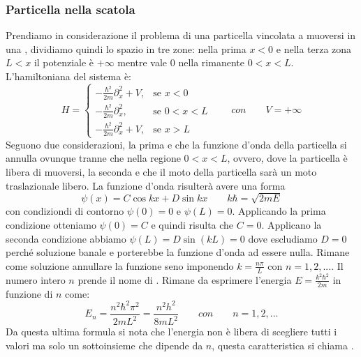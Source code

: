\subsubsection{Particella nella scatola}
Prendiamo in considerazione il problema di una particella vincolata a muoversi in una , dividiamo quindi lo spazio in tre zone: nella prima $x < 0$ e nella terza zona $L < x$ il potenziale è $+\infty$ mentre vale $0$ nella rimanente $0 < x < L$. L'hamiltoniana del sistema è:
$$H=\begin{cases}
 - \frac{\hbar^2}{2m} \partial_x^2 + V, & \mbox{se } x<0   \\
 - \frac{\hbar^2}{2m} \partial_x^2,     & \mbox{se } 0<x<L \\
 - \frac{\hbar^2}{2m} \partial_x^2 + V, & \mbox{se } x>L
\end{cases} \qquad con \qquad V = +\infty$$
Seguono due considerazioni, la prima e che la funzione d'onda della particella si annulla ovunque tranne che nella regione $0 < x < L$, ovvero, dove la particella è libera di muoversi, la seconda e che il moto della particella sarà un moto traslazionale libero. La funzione d'onda risulterà avere una forma
$$\psi(x) = C \cos{kx} + D \sin{kx} \qquad k\hbar = \sqrt{2mE}$$
con condiziondi di contorno $\psi(0) = 0$ e $\psi(L) = 0$. Applicando la prima condizione otteniamo $\psi(0) = C$ e quindi risulta che $C = 0$. Applicano la seconda condizione abbiamo $\psi(L) = D \sin(kL) = 0$ dove escludiamo $D = 0$ perché soluzione banale e porterebbe la funzione d'onda ad essere nulla. Rimane come soluzione annullare la funzione seno imponendo $k = \frac{n\pi}{L}$ con $n = 1, 2, ...$. Il numero intero $n$ prende il nome di . Rimane da esprimere l'energia $E = \frac{k^2 \hbar^2}{2m}$ in funzione di $n$ come:
$$E_n = \frac{n^2 \hbar^2 \pi^2}{2 m L^2} = \frac{n^2 h^2}{8 m L^2} \qquad con \qquad n = 1, 2, ...$$
Da questa ultima formula si nota che l'energia non è libera di scegliere tutti i valori ma solo un sottoinsieme che dipende da $n$, questa caratteristica si chiama .

